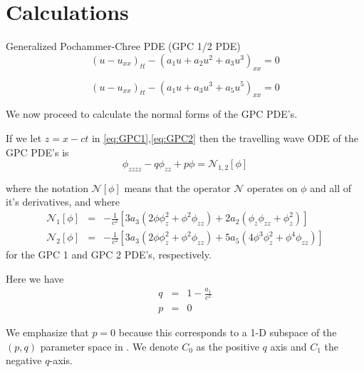 \section{Calculations}

Generalized Pochammer-Chree PDE (GPC 1/2 PDE) \cite{Roy1}
\begin{equation}\label{eq:GPC1}
\left( u -  u_{xx}\right)_{tt} - \left( a_1 u + a_2 u^2 + a_3 u^3\right)_{xx} = 0 
\end{equation}

\begin{equation}\label{eq:GPC2}
\left( u -  u_{xx}\right)_{tt} - \left( a_1 u + a_3 u^3 + a_5 u^5\right)_{xx} = 0 
\end{equation}

We now proceed to calculate the normal forms of the GPC PDE's.

If we let $z= x - c t$  in \eqref{eq:GPC1},\eqref{eq:GPC2} then the travelling wave 
ODE of the GPC PDE's is
\begin{equation} \label{eq:ode}
\phi_{zzzz} - q \phi_{zz} + p \phi = \mathcal{N}_{1,2}[\phi]
\end{equation}

where the notation $\mathcal{N[\phi]}$ means that the operator $\mathcal{N}$ operates on $\phi$ and all of it's derivatives, and where
\begin{subequations}
\begin{eqnarray}
\mathcal{N}_1\left[\phi\right] &=& -\frac{1}{c^2}\left[ 3 a_3 \left( 2 \phi \phi_z^2 +  \phi^2 \phi_{zz}\right) + 2 a_2 \left( \phi_z \phi_{zz}  + \phi_z^2\right)  \right]\\
\mathcal{N}_2\left[\phi\right] &=& -\frac{1}{c^2}\left[ 3 a_3 \left( 2\phi \phi_z^2 + \phi^2 \phi_{zz}\right)+ 5 a_5 \left(4 \phi^3\phi_z^2 +  \phi^4 \phi_{zz}\right) \right]
\end{eqnarray}
\end{subequations}
for the GPC 1 and GPC 2 PDE's, respectively.

Here we have
\begin{subequations}
\begin{eqnarray}
q &=& 1 - \frac{a_1}{c^2} \\
p &=& 0 
\end{eqnarray}
\end{subequations}

We emphasize that $p=0$ because this corresponds to a 1-D subspace of the $(p,q)$ parameter space in \cite{Roy1}. We denote $C_0$ as the positive $q$ axis and $C_1$ the negative $q$-axis. 


